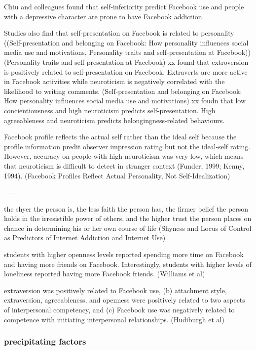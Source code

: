 Chiu and colleagues found that self-inferiority predict Facebook use and people with a depressive character are prone to have Facebook addiction. 


Studies also find that self-presentation on Facebook is related to personality ((Self-presentation and belonging on Facebook: How personality influences social media use and motivations, Personality traits and self-presentation at Facebook)) (Personality traits and self-presentation at Facebook) xx found that extroversion is positively related to self-presentation on Facebook. Extraverts are more active in Facebook activities while neuroticism is negatively correlated with the likelihood to writing comments. (Self-presentation and belonging on Facebook: How personality influences social media use and motivations) xx foudn that low concientiousness and high neuroticism predicts self-presentation. High agreeableness and neuroticism predicts belongingness-related behaviours.

Facebook profile reflects the actual self rather than the ideal self because the profile information predit observer impression rating but not the ideal-self rating. However, accuracy on people with high neuroticism was very low, which means that neuroticism is difficult to detect in stranger context (Funder, 1999; Kenny, 1994). (Facebook Profiles Reflect Actual Personality, Not Self-Idealization)

----



 the shyer the person is, the less faith the person has, the firmer belief the person holds in the irresistible power of others, and the higher trust the person places on chance in determining his or her own course of life (Shyness and Locus of Control as Predictors of Internet Addiction and Internet Use)

 students with higher openness levels reported spending more time on Facebook and having more friends on Facebook. Interestingly, students with higher levels of loneliness reported having more Facebook friends. (Williams et al)

  extraversion was positively related to Facebook use, (b) attachment style, extraversion, agreeableness, and openness were positively related to two aspects of interpersonal competency, and (c) Facebook use was negatively related to competence with initiating interpersonal relationships. (Hudiburgh et al)




\subsubsection{precipitating factors}


